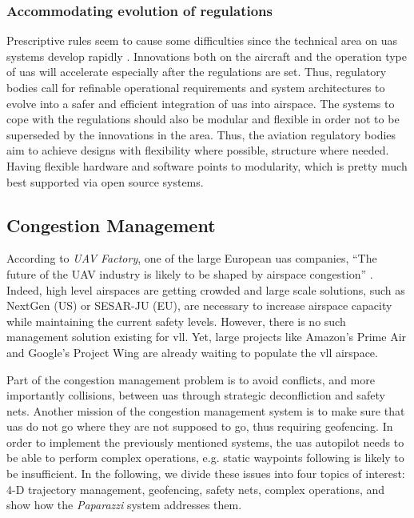 \subsubsection{Accommodating evolution of regulations}
Prescriptive rules seem to cause some difficulties since the technical area on \gls{uas} systems develop rapidly \cite{A_NPA_EASA2015}. Innovations both on the aircraft and the operation type of \gls{uas} will accelerate especially after the regulations are set. Thus, regulatory bodies call for refinable operational requirements and system architectures to evolve into a safer and efficient integration of \gls{uas} into airspace. The systems to cope with the regulations should also be modular and flexible in order not to be superseded by the innovations in the area. 
Thus, the aviation regulatory bodies aim to achieve designs with flexibility where possible, structure where needed. Having flexible hardware and software points to modularity, which is pretty much best supported via open source systems.

\subsection{Congestion Management}
According to \textit{UAV Factory}, one of the large European \gls{uas} companies, ``The future of the UAV industry is likely to be shaped by airspace congestion'' \cite{europe_report_civilian_drone}.
	Indeed, high level airspaces are getting crowded and large scale solutions, such as NextGen (US) or SESAR-JU (EU), are necessary to increase airspace capacity while maintaining the current safety levels.
	However, there is no such management solution existing for \gls{vll}. Yet, large projects like Amazon's Prime Air and Google's Project Wing are already waiting to populate the \gls{vll} airspace.	
	
	Part of the congestion management problem is to avoid conflicts, and more importantly collisions, between \gls{uas} through strategic deconfliction and safety nets.
	Another mission of the congestion management system is to make sure that \gls{uas} do not go where they are not supposed to go, thus requiring geofencing.
	In order to implement the previously mentioned systems, the \gls{uas} autopilot needs to be able to perform complex operations, e.g. static waypoints following is likely to be insufficient.
	In the following, we divide these issues into four topics of interest: 4-D trajectory management, geofencing, safety nets, complex operations, and show how the \emph{Paparazzi} system addresses them.
	
